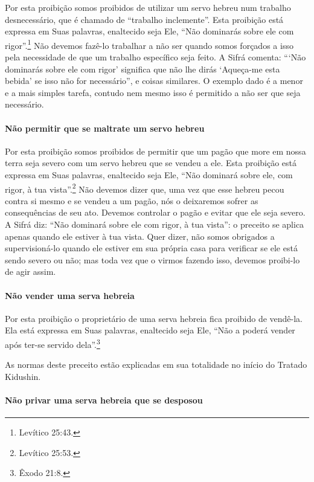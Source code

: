 Por esta proibição somos proibidos de utilizar um servo hebreu num
trabalho desnecessário, que é chamado de ``trabalho inclemente''. Esta
proibição está expressa em Suas palavras, enaltecido seja Ele, ``Não
dominarás sobre ele com rigor''.\footnote{Levítico 25:43.} Não devemos fazê-lo
trabalhar a não ser quando somos forçados a isso pela necessidade de
que um trabalho específico seja feito. A Sifrá comenta: ```Não dominarás
sobre ele com rigor' significa que não lhe dirás `Aqueça-me esta bebida'
se isso não for necessário'', e coisas similares. O exemplo dado é a
menor e a mais simples tarefa, contudo nem mesmo isso é permitido a não
ser que seja necessário.

\paragraph{Não permitir que se maltrate um servo hebreu}

Por esta proibição somos proibidos de permitir que um pagão que more em
nossa terra seja severo com um servo hebreu que se vendeu a ele. Esta
proibição está expressa em Suas palavras, enaltecido seja Ele, ``Não
dominará sobre ele, com rigor, à tua vista''.\footnote{Levítico 25:53.} Não
devemos dizer que, uma vez que esse hebreu pecou contra si mesmo e se
vendeu a um pagão, nós o deixaremos sofrer as consequências de seu ato.
Devemos controlar o pagão e evitar que ele seja severo. A Sifrá diz:
``Não dominará sobre ele com rigor, à tua vista'': o preceito se aplica
apenas quando ele estiver à tua vista. Quer dizer, não somos
obrigados a supervisioná-lo quando ele estiver em sua própria casa para
verificar se ele está sendo severo ou não; mas toda vez que o virmos
fazendo isso, devemos proibi-lo de agir assim.

\paragraph{Não vender uma serva hebreia}

Por esta proibição o proprietário de uma serva hebreia fica proibido de
vendê-la. Ela está expressa em Suas palavras, enaltecido seja Ele, ``Não
a poderá vender após ter-se servido dela''.\footnote{Êxodo 21:8.}

As normas deste preceito estão explicadas em sua totalidade no início
do Tratado Kidushin.

\paragraph{Não privar uma serva hebreia que se desposou}

